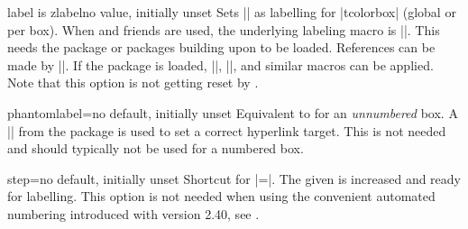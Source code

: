 \begin{docTcbKey}[][doc new=2023-02-08]{label is zlabel}{}{no value, initially unset}
Sets |\zlabel| as labelling for |tcolorbox| (global or per box).
When  and friends are used, the underlying labeling macro is |\zlabel|.
This needs the  package \cite{oberdiek:zref} or packages building upon  to be loaded.
References can be made by |\zref|. If the  package \cite{barros:zref-clever} is loaded,
|\zcref|, |\zcpageref|, and similar macros can be applied.
Note that this option is not getting reset by .
\end{docTcbKey}




\begin{docTcbKey}[][doc new=2014-11-28]{phantomlabel}{=}{no default, initially unset}
Equivalent to  for an \emph{unnumbered} box.
A || from the package  \cite{rahtz:hyperref} is used to set a correct
hyperlink target.
This is not needed and should typically not be used for a numbered box.
\end{docTcbKey}

\clearpage

\begin{docTcbKey}{step}{=}{no default, initially unset}
Shortcut for |={}|. The given  is
increased and ready for labelling. This option is not needed when
using the convenient automated numbering introduced with version 2.40,
see .
\end{docTcbKey}

